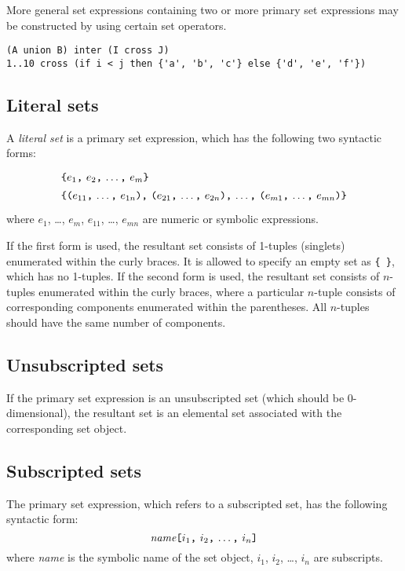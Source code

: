 \documentclass[11pt]{report}
\def\para#1{\noindent{\bf#1}}
\begin{document}
More general set expressions containing two or more primary set
expressions may be constructed by using certain set operators.

\para{Examples}

\begin{verbatim}
(A union B) inter (I cross J)
1..10 cross (if i < j then {'a', 'b', 'c'} else {'d', 'e', 'f'})
\end{verbatim}

\subsection{Literal sets}

A {\it literal set} is a primary set expression, which has the
following two syntactic forms:
$$
{\def\arraystretch{1.4}
\begin{array}{l}
\mbox{{\tt\{}$e_1${\tt,} $e_2${\tt,} \dots{\tt,} $e_m${\tt\}}}\\
\mbox{{\tt\{(}$e_{11}${\tt,} \dots{\tt,} $e_{1n}${\tt),}
{\tt(}$e_{21}${\tt,} \dots{\tt,} $e_{2n}${\tt),} \dots{\tt,}
{\tt(}$e_{m1}${\tt,} \dots{\tt,} $e_{mn}${\tt)\}}}\\
\end{array}
}
$$
where $e_1$, \dots, $e_m$, $e_{11}$, \dots, $e_{mn}$ are numeric or
symbolic expressions.

If the first form is used, the resultant set consists of 1-tuples
(singlets) enumerated within the curly braces. It is allowed to specify
an empty set as {\tt\{\ \}}, which has no 1-tuples. If the second form
is used, the resultant set consists of $n$-tuples enumerated within the
curly braces, where a particular $n$-tuple consists of corresponding
components enumerated within the parentheses. All $n$-tuples should
have the same number of components.

\subsection{Unsubscripted sets}

If the primary set expression is an unsubscripted set (which should be
0-dimen\-sional), the resultant set is an elemental set associated with
the corresponding set object.

\subsection{Subscripted sets}

The primary set expression, which refers to a subscripted set, has the
following syntactic form:
$$\mbox{{\it name}{\tt[}$i_1${\tt,} $i_2${\tt,} \dots{\tt,}
$i_n${\tt]}}$$
where {\it name} is the symbolic name of the set object, $i_1$, $i_2$,
\dots, $i_n$ are subscripts.
\end{document}
